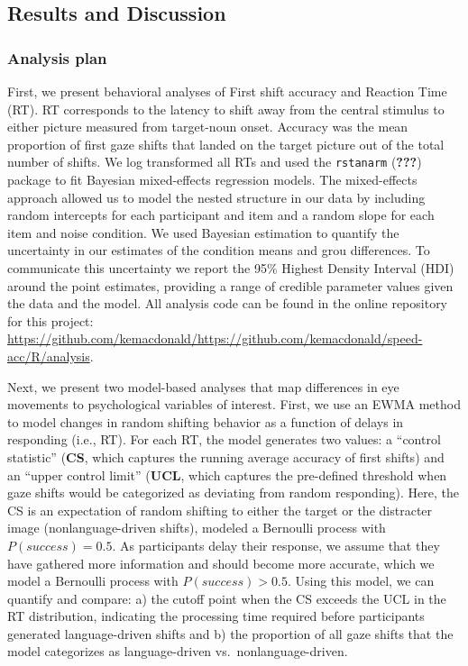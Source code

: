\documentclass[10pt, letterpaper]{article}
\begin{document}
\subsection{Results and Discussion}\label{results-and-discussion}

\subsubsection{Analysis plan}\label{analysis-plan}

First, we present behavioral analyses of First shift accuracy and
Reaction Time (RT). RT corresponds to the latency to shift away from the
central stimulus to either picture measured from target-noun onset.
Accuracy was the mean proportion of first gaze shifts that landed on the
target picture out of the total number of shifts. We log transformed all
RTs and used the \texttt{rstanarm} ({\textbf{???}}) package to fit
Bayesian mixed-effects regression models. The mixed-effects approach
allowed us to model the nested structure in our data by including random
intercepts for each participant and item and a random slope for each
item and noise condition. We used Bayesian estimation to quantify the
uncertainty in our estimates of the condition means and grou
differences. To communicate this uncertainty we report the 95\% Highest
Density Interval (HDI) around the point estimates, providing a range of
credible parameter values given the data and the model. All analysis
code can be found in the online repository for this project:
\url{https://github.com/kemacdonald/https://github.com/kemacdonald/speed-acc/R/analysis}.

Next, we present two model-based analyses that map differences in eye
movements to psychological variables of interest. First, we use an EWMA
method to model changes in random shifting behavior as a function of
delays in responding (i.e., RT). For each RT, the model generates two
values: a ``control statistic'' (\textbf{CS}, which captures the running
average accuracy of first shifts) and an ``upper control limit''
(\textbf{UCL}, which captures the pre-defined threshold when gaze shifts
would be categorized as deviating from random responding). Here, the CS
is an expectation of random shifting to either the target or the
distracter image (nonlanguage-driven shifts), modeled a Bernoulli
process with \(P(success) = 0.5\). As participants delay their response,
we assume that they have gathered more information and should become
more accurate, which we model a Bernoulli process with
\(P(success) > 0.5\). Using this model, we can quantify and compare: a)
the cutoff point when the CS exceeds the UCL in the RT distribution,
indicating the processing time required before participants generated
language-driven shifts and b) the proportion of all gaze shifts that the
model categorizes as language-driven vs.~nonlanguage-driven.
\end{document}
